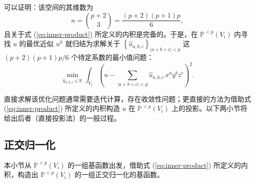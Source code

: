 可以证明：该空间的其维数为
\begin{equation}
n=\binom{p+2}{3}=\frac{(p+2)(p+1)p}{6},
\end{equation}
且关于式 (\ref{eq:inner-product}) 所定义的内积是完备的。于是，在 $\mathbb{P}^{<p}(V_{i})$
内寻找 $u$ 的最优近似 $u^{h}$ 就归结为求解关于 $\left\{ \hat{u}_{a,b,c}\right\} _{\vert a+b+c\vert<p}$
这 $(p+2)(p+1)p/6$ 个待定系数的最小值问题：
\begin{equation}
\min_{\hat{u}_{a,b,c}\in\mathbb{R}}\int_{V_{i}}\left(u-\sum_{\vert a+b+c\vert<p}\hat{u}_{a,b,c}\,x^{a}y^{b}z^{c}\right)^{2}.
\end{equation}

直接求解该优化问题通常需要迭代计算，存在收敛性问题；更直接的方法为借助式 (\ref{eq:inner-product}) 所定义的内积构造
$u$ 在 $\mathbb{P}^{<p}(V_{i})$ 上的投影。以下两小节将给出后者（直接投影法）的一般过程。

\newpage{}

\subsection{正交归一化\label{subsec:orthonormal}}

本小节从 $\mathbb{P}^{<p}(V_{i})$ 的一组基函数出发，借助式 (\ref{eq:inner-product})
所定义的内积，构造出 $\mathbb{P}^{<p}(V_{i})$ 的一组正交归一化的基函数。

